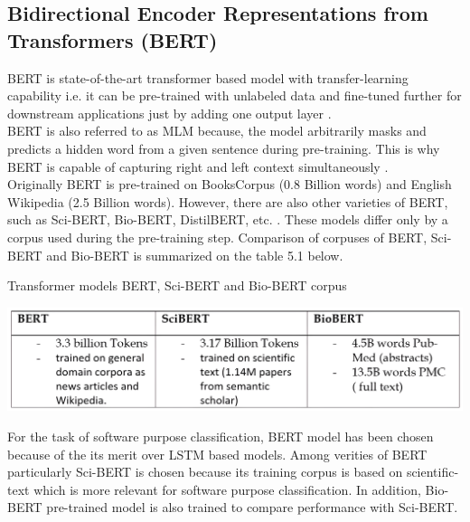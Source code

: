 \subsection{Bidirectional Encoder Representations from Transformers (\ac{BERT})}
\label{sec:chapter05:DLModels:Transformer:BERT}

BERT is state-of-the-art transformer based model with transfer-learning capability i.e. it can be pre-trained with unlabeled data and fine-tuned further for downstream applications just by adding one output layer \citep{devlin2018bert, ezen2020comparison}. \\

BERT is also referred to as \ac{MLM} because, the model arbitrarily masks and predicts a hidden word from a given sentence during pre-training. This is why BERT is capable of capturing right and left context simultaneously \citep{devlin2018bert}.  \\


Originally BERT is pre-trained on BooksCorpus (0.8 Billion words) and English Wikipedia (2.5 Billion words). However, there are also other varieties of BERT, such as \ac{Sci-BERT}, \ac{Bio-BERT}, DistilBERT, etc. \citep{beltagy2019scibert, lee2020biobert, sanh2019distilbert}. These models differ only by a corpus used during the pre-training step. Comparison of corpuses of BERT, Sci-BERT and Bio-BERT is summarized on the table 5.1 below.


\begin{table}[htbp]
	\centering
	\caption{Transformer models \ac{BERT}, \ac{Sci-BERT} and \ac{Bio-BERT} corpus }
	\includegraphics[width=1\textwidth]{4.graphics/figures/ch_5/BERT_Corpus}
	\label{fig:chapter03:setup}
\end{table}

For the task of software purpose classification, BERT model has been chosen because of the its merit over LSTM based models. Among verities of BERT particularly Sci-BERT is chosen because its training corpus is based on scientific-text which is more relevant for software purpose classification. In addition, Bio-BERT pre-trained model is also trained to compare performance with Sci-BERT. \\


